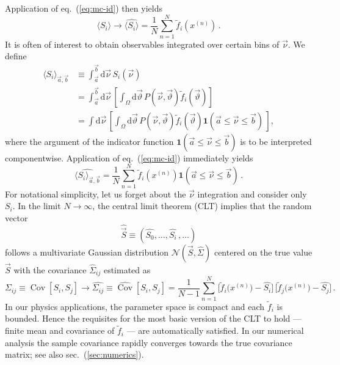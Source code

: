 \documentclass[aps,prd,reprint,nofootinbib,preprintnumbers]{revtex4}
\newcommand{\dual}[1]{\tilde{#1}}
\newcommand{\est}[1]{\widehat{#1}}
\newcommand{\nuvec}{\vec{\nu}}
\newcommand{\refeq}[1]{eq.~(\ref{eq:#1})}
\newcommand{\refsec}[1]{sec.~(\ref{sec:#1})}
\newcommand{\rmdx}[1]{\mbox{d} #1 \,} %
\newcommand{\thvec}{\vec{\vartheta}}
\renewcommand{\theta}{\vartheta}
\newcommand{\vecest}[1]{\widehat{\vec{#1}}}
\DeclareMathOperator{\cov}{Cov}
\begin{document}
Application of \refeq{mc-id} then yields
\begin{equation}
    \langle S_i\rangle \to \widehat{\langle S_i\rangle} = \frac{1}{N} \sum_{n=1}^{N} \dual{f}_i(x^{(n)})\,.
\end{equation}
It is often of interest to obtain observables integrated over certain
bins of $\nuvec$. We define
\begin{align}
    \langle S_i\rangle_{\vec{a},\vec{b}}
    & \equiv \int_{\vec{a}}^{\vec{b}} \rmdx{\nuvec} S_i(\nuvec)\\
    & = \int_{\vec{a}}^{\vec{b}} \rmdx{\nuvec} \left[\int_{\Omega} \rmdx{\vec\theta} P(\nuvec,\thvec) \dual{f}_i(\thvec)  \right]\\
    & = \int \rmdx{\nuvec} \left[\int_{\Omega} \rmdx{\vec\theta}  P(\nuvec,\thvec) \dual{f}_i(\thvec)
        \mathbf{1}(\vec{a} \le \nuvec \le \vec{b})\,
        \right],
\end{align}
where the argument of the indicator function $ \mathbf{1}(\vec{a} \le
\nuvec \le \vec{b})$ is to be interpreted componentwise.
Application of \refeq{mc-id} immediately yields
\begin{equation}
    \label{eq:bin-importance}
    \widehat{\langle S_i\rangle_{\vec{a},\vec{b}}}
    = \frac{1}{N} \sum_{n=1}^{N} \dual{f}_i(x^{(n)})         \mathbf{1}(\vec{a} \le \nuvec \le \vec{b})\,.
\end{equation}
For notational simplicity, let us forget about the $\nuvec$
integration and consider only $S_i$. In the limit $N \to \infty$, the
central limit theorem (CLT) implies that the random vector
\begin{equation}
  \label{eq:angular-obs-vec}
  \vecest{S} \equiv (\est{S_0}, \dots, \est{S_i}\,,
  \dots)
\end{equation}
follows a multivariate Gaussian distribution $\mathcal{N}(\vec{S},
\widehat{\Sigma})$ centered on the true value $\vec{S}$ with the
covariance $\widehat{\Sigma}_{ij}$ estimated as
\begin{equation}
    \Sigma_{ij} \equiv \cov[S_i,S_j] \to \est{\Sigma_{ij}} \equiv \est{\cov}[{S}_i, {S}_j]
        = \frac{1}{N - 1} \sum_{n=1}^{N} \Big[\dual{f}_i\big(x^{(n)}\big) - \est{S_i}\Big]\,\Big[\dual{f}_j\big(x^{(n)}\big) - \widehat{S_j}\Big]\,.
\end{equation}
In our physics applications, the parameter space is compact and each
$\dual{f}_i$ is bounded. Hence the requisites for the most basic
version of the CLT to hold --- finite mean and covariance of
$\dual{f}_i$ --- are automatically satisfied.
In our numerical analysis the sample covariance rapidly converges towards the true covariance
matrix; see also \refsec{numerics}.\\
\end{document}
